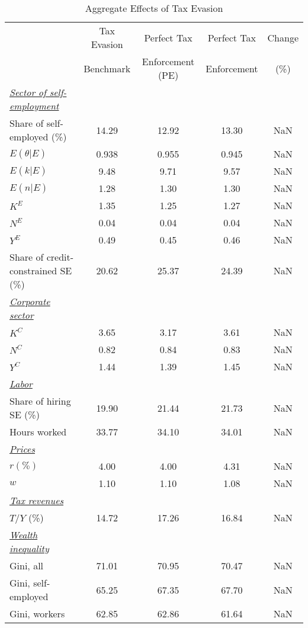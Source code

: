 \documentclass[a4paper,10pt]{article}
\begin{document}
 
\begin{table}[htbp] \centering 
\caption{Aggregate Effects of Tax Evasion} 
\label{table:aggregates} 
\begin{tabular}{l c c c c} \hline 
& Tax Evasion  & Perfect Tax      & Perfect Tax &  Change  \\ 
& Benchmark  & Enforcement (PE) & Enforcement &   (\%) \\\hline \hline 
\textit{\underline{Sector of self-employment}} &  & & &  \\  
Share of self-employed (\%) &    14.29 &    12.92 &    13.30 &      NaN \\ 
$E(\theta|E)$ &    0.938 &    0.955 &    0.945 &      NaN \\ 
$E(k|E)$       &     9.48 &     9.71 &     9.57 &      NaN \\ 
$E(n|E)$       &     1.28 &     1.30 &     1.30 &      NaN \\ 
$K^{E}$        &     1.35 &     1.25 &     1.27 &      NaN \\ 
$N^{E}$        &     0.04 &     0.04 &     0.04 &      NaN \\ 
$Y^{E}$        &     0.49 &     0.45 &     0.46 &      NaN \\ 
Share of credit-constrained SE (\%) &    20.62 &    25.37 &    24.39 &      NaN \\ 
\textit{\underline{Corporate sector}} &  & & & \\  
$K^{C}$   &     3.65 &     3.17 &     3.61 &      NaN \\ 
$N^C $    &     0.82 &     0.84 &     0.83 &      NaN \\ 
$Y^{C}$   &     1.44 &     1.39 &     1.45 &      NaN \\ 
\textit{\underline{Labor}} &  & & & \\  
Share of hiring SE (\%)  &    19.90 &    21.44 &    21.73 &      NaN \\ 
Hours worked    &    33.77 &    34.10 &    34.01 &      NaN \\ 
\textit{\underline{Prices}} &  & & & \\  
$r (\%)$   &     4.00 &     4.00 &     4.31 &      NaN \\ 
$w$    &     1.10 &     1.10 &     1.08 &      NaN \\ 
\textit{\underline{Tax revenues}} &  & & & \\  
$T/Y$ (\%)  &    14.72 &    17.26 &    16.84 &      NaN \\ 
\textit{\underline{Wealth inequality}} &  & & & \\  
Gini, all  &    71.01 &    70.95 &    70.47 &      NaN \\ 
Gini, self-employed  &    65.25 &    67.35 &    67.70 &      NaN \\ 
Gini, workers  &    62.85 &    62.86 &    61.64 &      NaN \\ 
\hline  
 \end{tabular} 
\end{table} 
\end{document}
